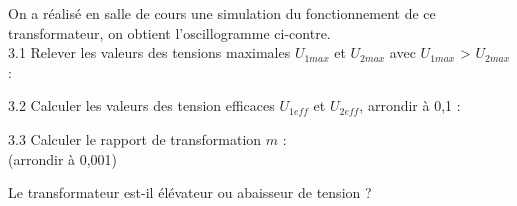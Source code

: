 \documentclass[11pt,a4paper]{article}
\newcommand{\cadreblanc}[1]{%
\medskip\framebox[\linewidth][c]{%
\rule{0mm}{#1mm}}\par
\medskip}
\begin{document}
\begin{minipage}{.45\textwidth}%
On a réalisé en salle de cours une simulation du fonctionnement de ce transformateur, on obtient l'oscillogramme ci-contre. \\[3mm]

3.1 Relever les valeurs des tensions maximales $U_{1 max}$ et $U_{2 max} $ avec $U_{1 max}$ > $U_{2 max}$ :

\begin{multicols}{2}
 \dotfill 

 \dotfill 

 \end{multicols}

 
3.2 Calculer les valeurs des tension efficaces $U_{1 eff}$ et $U_{2 eff} $, arrondir à 0,1 : 

\begin{multicols}{2}
 \dotfill 

 \dotfill 

 \end{multicols}

 
\end{minipage}%
\hfill
\begin{minipage}{.40\textwidth}%

\osci[%
scale=0.6,
second channel=1,
screen offset one=0,
screen offset two=0,
time div=5,
voltage div one=200,
voltage div two=20,
sample rate=200,
xy mode=0,
func one=582*sin(2*180/0.020*x),
func two=41*sin(2*180/0.020*x+180),
color one=D62626,
color two=1053AF,
graph back color=FFFFFF,
info back color=D6D6D6,
info text color=000000,
main axis color=000000,
grid color=CCCCCC
]

\end{minipage}%

\vspace{8mm}

\newpage 

\begin{minipage}{.50\textwidth}%
3.3 Calculer le rapport de transformation $m$ : \\(arrondir à 0,001) 
\end{minipage}%
\hfill
\begin{minipage}{.40\textwidth}%
\cadreblanc{15}
\end{minipage}%





 Le transformateur est-il élévateur ou abaisseur de tension ? 

\cadreblanc{15}
\end{document}
